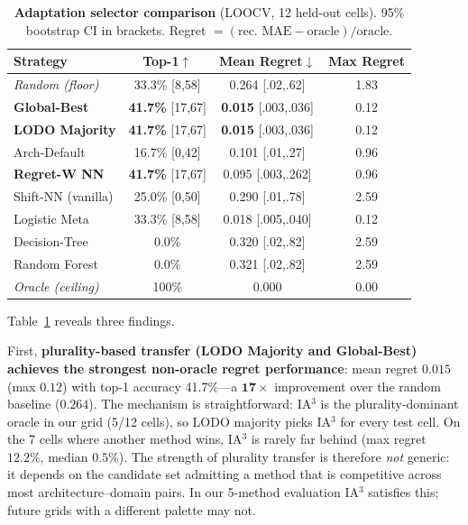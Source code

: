 \documentclass{article}
\begin{document}
\begin{table}[t]
\centering
\caption{\textbf{Adaptation selector comparison} (LOOCV, 12 held-out cells). 95\% bootstrap CI in brackets. Regret $= (\text{rec.\ MAE} - \text{oracle}) / \text{oracle}$.}
\label{tab:selector}
\small
\begin{tabular}{lccc}
\toprule
Strategy & Top-1$\uparrow$ & Mean Regret$\downarrow$ & Max Regret \\
\midrule
\textit{Random (floor)}  & 33.3\% \scriptsize{[8,58]} & 0.264 \scriptsize{[.02,.62]} & 1.83 \\
\textbf{Global-Best}      & \textbf{41.7\%} \scriptsize{[17,67]} & \textbf{0.015} \scriptsize{[.003,.036]} & 0.12 \\
\textbf{LODO Majority}    & \textbf{41.7\%} \scriptsize{[17,67]} & \textbf{0.015} \scriptsize{[.003,.036]} & 0.12 \\
\midrule
Arch-Default              & 16.7\% \scriptsize{[0,42]} & 0.101 \scriptsize{[.01,.27]} & 0.96 \\
\textbf{Regret-W NN}      & \textbf{41.7\%} \scriptsize{[17,67]} & 0.095 \scriptsize{[.003,.262]} & 0.96 \\
Shift-NN (vanilla)        & 25.0\% \scriptsize{[0,50]} & 0.290 \scriptsize{[.01,.78]} & 2.59 \\
Logistic Meta             & 33.3\% \scriptsize{[8,58]} & 0.018 \scriptsize{[.005,.040]} & 0.12 \\
Decision-Tree             &  0.0\% & 0.320 \scriptsize{[.02,.82]} & 2.59 \\
Random Forest             &  0.0\% & 0.321 \scriptsize{[.02,.82]} & 2.59 \\
\midrule
\textit{Oracle (ceiling)} & 100\% & 0.000 & 0.00 \\
\bottomrule
\end{tabular}
\end{table}

Table~\ref{tab:selector} reveals three findings.

First, \textbf{plurality-based transfer (LODO Majority and Global-Best) achieves the strongest non-oracle regret performance}: mean regret $0.015$ (max $0.12$) with top-1 accuracy 41.7\%---a $\mathbf{17{\times}}$ improvement over the random baseline ($0.264$). The mechanism is straightforward: IA$^3$ is the plurality-dominant oracle in our grid (5/12 cells), so LODO majority picks IA$^3$ for every test cell. On the 7 cells where another method wins, IA$^3$ is rarely far behind (max regret $12.2\%$, median $0.5\%$). The strength of plurality transfer is therefore \emph{not} generic: it depends on the candidate set admitting a method that is competitive across most architecture--domain pairs. In our 5-method evaluation IA$^3$ satisfies this; future grids with a different palette may not.
\end{document}
